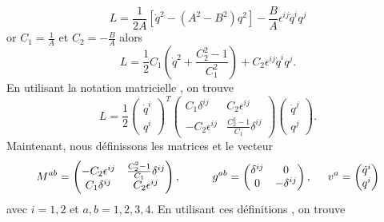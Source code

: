 \documentclass[12pt,a4paper, openany]{article}
\begin{document}
		  	\begin{equation}
		  	L=\frac{1}{2A}\left[\dot{q}^{2}-\left(A^{2}-B^{2}\right)q^{2}\right]-\frac{B}{A}\epsilon^{ij}\dot{q}^iq^j
		  \end{equation}
		  or\hspace{0.3cm} $C_1=\frac{1}{A}$\hspace{0.2cm} et\hspace{0.2cm} $C_2=-\frac{B}{A}$\hspace{0.5cm} alors 
		  \begin{equation}
		  	L=\frac{1}{2}C_1\left(\dot{q}^2+\frac{C^2_2-1}{C^2_1}\right)+C_2 \epsilon^{ij} \dot{q}^iq^j .
		  \end{equation}
		  En utilisant la notation matricielle , on trouve 
		  \begin{equation}
		  	L=\frac{1}{2}
		  	\begin{pmatrix}
		  		\dot{q}^i \\
		  		q^i 
		  	\end{pmatrix}
		  	^{T}
		  	\begin{pmatrix}
		  		C_1\delta^{ij} & C_2\epsilon^{ij} \\
		  		-C_2\epsilon^{ij} & \frac{C^2_2-1}{C_1}\delta^{ij}
		  	\end{pmatrix}
		  	\begin{pmatrix}
		  	\dot{q}^j \\
		  	q^j	
		  	\end{pmatrix} .
		  	 \end{equation}
		  	 Maintenant, nous définissons les matrices et le vecteur
		  	 \begin{equation}
		  	  M^{ab}= 
		  	 \begin{pmatrix}
		  	 	-C_2\epsilon^{ij} & \frac{C^2_2-1}{C_1}\delta^{ij}	\\
		  	 	C_1\delta^{ij} & C_2\epsilon^{ij} 
		  	  \end{pmatrix} , \hspace{1cm}g^{ab}=
		  	 \begin{pmatrix}
		  	 	\delta^{ij} & 0 \\
		  	 	0 & -\delta^{ij}
		  	 \end{pmatrix} , \hspace{0.5cm} v^a=
		  	 \begin{pmatrix}
		  	 	\dot{q}^i \\
		  	 	q^i
		  	 \end{pmatrix}
		 	\end{equation}
		 	avec $i=1,2$ et $a,b=1,2,3,4$. En utilisant ces définitions , on trouve 
\end{document}
